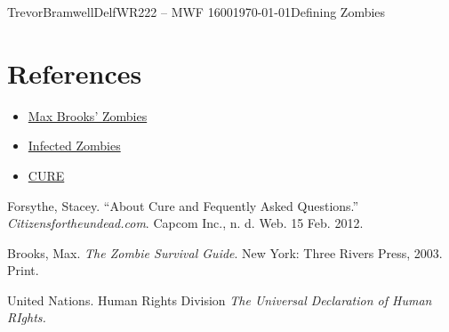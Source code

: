 \documentclass[12pt,letterpaper]{article}
\begin{document}
\begin{mla}{Trevor}{Bramwell}{Delf}{WR222 -- MWF 1600}{\today}{Defining Zombies}

\section*{References}
\begin{itemize}
\item
\href{http://zombie.wikia.com/wiki/Zombies\_(Max\_Brooks)}{Max Brooks' Zombies}
\item
\href{http://zombie.wikia.com/wiki/Infected}{Infected Zombies}
\item
\href{http://www.citizensfortheundead.com/about.html}{CURE}
\end{itemize}

\begin{workscited}
\bibent
Forsythe, Stacey. ``About Cure and Fequently Asked Questions.'' \emph{Citizensfortheundead.com}. Capcom Inc., n. d. Web. 15 Feb. 2012.

\bibent
Brooks, Max. \emph{The Zombie Survival Guide}. New York: Three Rivers Press,
2003. Print.

\bibent
United Nations. Human Rights Division \emph{The Universal Declaration of Human RIghts.} 
\end{workscited}
\end{mla}
\end{document}
